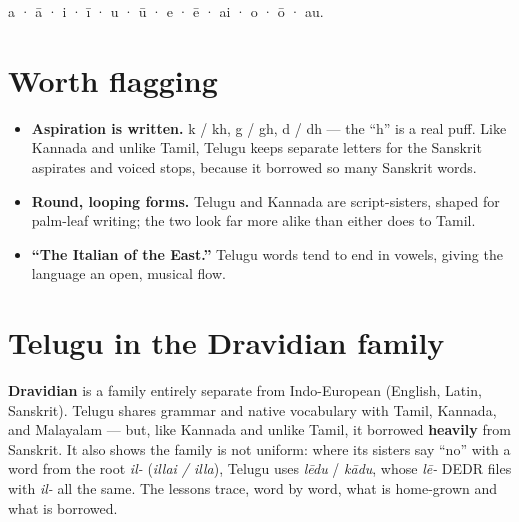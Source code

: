 \textbf{} a · \textbf{} ā · \textbf{} i · \textbf{} ī · \textbf{} u · \textbf{} ū · \textbf{} e · \textbf{} ē · \textbf{} ai · \textbf{} o · \textbf{} ō · \textbf{} au.

\section*{Worth flagging}

\begin{itemize}
\raggedright
\setlength{\itemsep}{0.35em}
  \item \textbf{Aspiration is written.}  k /  kh,  g /  gh,  d /  dh — the \textquotedblleft{}h\textquotedblright{} is a real puff. Like Kannada and unlike Tamil, Telugu keeps separate letters for the Sanskrit aspirates and voiced stops, because it borrowed so many Sanskrit words.
  \item \textbf{Round, looping forms.} Telugu and Kannada are script-sisters, shaped for palm-leaf writing; the two look far more alike than either does to Tamil.
  \item \textbf{\textquotedblleft{}The Italian of the East.\textquotedblright{}} Telugu words tend to end in vowels, giving the language an open, musical flow.
\end{itemize}

\section*{Telugu in the Dravidian family}

\textbf{Dravidian} is a family entirely separate from Indo-European (English, Latin, Sanskrit). Telugu shares grammar and native vocabulary with Tamil, Kannada, and Malayalam — but, like Kannada and unlike Tamil, it borrowed \textbf{heavily} from Sanskrit. It also shows the family is not uniform: where its sisters say \textquotedblleft{}no\textquotedblright{} with a word from the root \emph{il-} (\emph{illai / illa}), Telugu uses \emph{lēdu} / \emph{kādu}, whose \emph{lē-} DEDR files with \emph{il-} all the same. The lessons trace, word by word, what is home-grown and what is borrowed.
